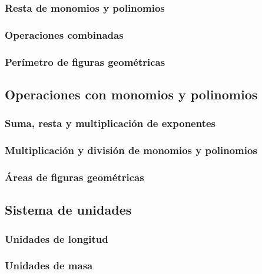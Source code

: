 \documentclass[12pt,addpoints]{evalua3}
\begin{document}
\begin{questions}
	\subsubsection{Resta de monomios y polinomios}
	\question{}
	\subsubsection{Operaciones combinadas}
	\question{}
	\subsubsection{Perímetro de figuras geométricas}
	\question{}
	\subsection   {Operaciones con monomios y polinomios}
	\subsubsection{Suma, resta y multiplicación de exponentes}
	\question{}
	\subsubsection{Multiplicación y división de monomios y polinomios}
	\question{}
	\subsubsection{Áreas de figuras geométricas}
	\question{}
	\subsection   {Sistema de unidades}
	\subsubsection{Unidades de longitud}
	\question{}
	\subsubsection{Unidades de masa}
	\question{}

\end{questions}
\end{document}
